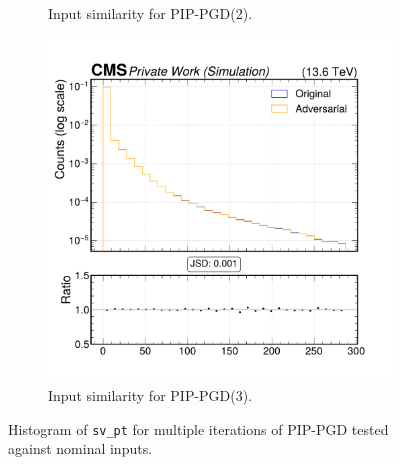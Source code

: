 \begin{figure}[h]
\begin{subfigure}[t]{0.32\textwidth}
    \caption*{Input similarity for PIP-PGD(2).}
  \end{subfigure}\hfill
  \begin{subfigure}[t]{0.32\textwidth}
    \includegraphics[width=\linewidth]{media/output/features/compare/combined_it_3/cmp_vtx_arr_sv_pt.pdf}
    \caption*{Input similarity for PIP-PGD(3).}
  \end{subfigure}

  \caption*{Histogram of \texttt{sv\_pt} for multiple iterations of PIP-PGD tested against nominal inputs.}
  \label{fig:combined_input_sv_pt}
\end{figure}

\newpage
